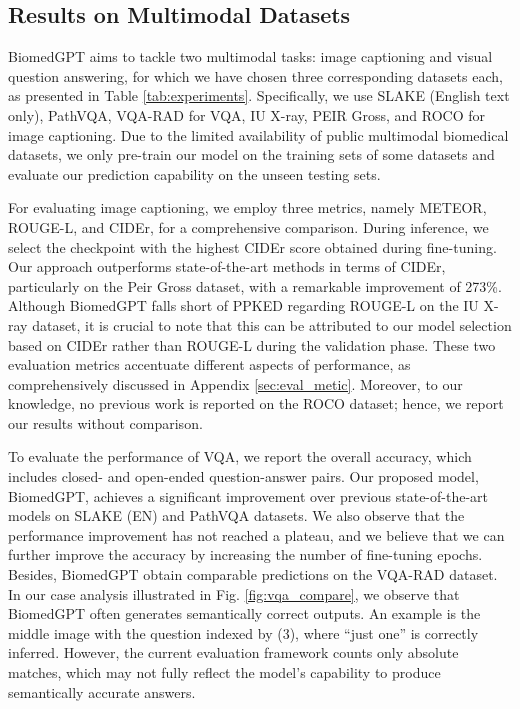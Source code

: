 \documentclass[10pt]{article} \usepackage[preprint]{tmlr}
\begin{document}
\subsection{Results on Multimodal Datasets}
BiomedGPT aims to tackle two multimodal tasks: image captioning and visual question answering, for which we have chosen three corresponding datasets each, as presented in Table \ref{tab:experiments}. Specifically, we use SLAKE (English text only), PathVQA, VQA-RAD for VQA, IU X-ray, PEIR Gross, and ROCO for image captioning. Due to the limited availability of public multimodal biomedical datasets, we only pre-train our model on the training sets of some datasets and evaluate our prediction capability on the unseen testing sets. 

For evaluating image captioning, we employ three metrics, namely METEOR, ROUGE-L, and CIDEr, for a comprehensive comparison. During inference, we select the checkpoint with the highest CIDEr score obtained during fine-tuning. Our approach outperforms state-of-the-art methods in terms of CIDEr, particularly on the Peir Gross dataset, with a remarkable improvement of 273\%. Although BiomedGPT falls short of PPKED regarding ROUGE-L on the IU X-ray dataset, it is crucial to note that this can be attributed to our model selection based on CIDEr rather than ROUGE-L during the validation phase. These two evaluation metrics accentuate different aspects of performance, as comprehensively discussed in Appendix \ref{sec:eval_metic}. Moreover, to our knowledge, no previous work is reported on the ROCO dataset; hence, we report our results without comparison.

To evaluate the performance of VQA, we report the overall accuracy, which includes closed- and open-ended question-answer pairs. Our proposed model, BiomedGPT, achieves a significant improvement over previous state-of-the-art models on SLAKE (EN) and PathVQA datasets. We also observe that the performance improvement has not reached a plateau, and we believe that we can further improve the accuracy by increasing the number of fine-tuning epochs. Besides, BiomedGPT obtain comparable predictions on the VQA-RAD dataset. In our case analysis illustrated in Fig. \ref{fig:vqa_compare}, we observe that BiomedGPT often generates semantically correct outputs. An example is the middle image with the question indexed by (3), where ``just one'' is correctly inferred. However, the current evaluation framework counts only absolute matches, which may not fully reflect the model's capability to produce semantically accurate answers.
\end{document}
